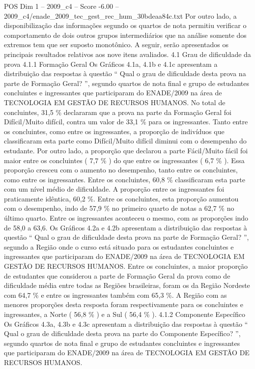 \begin{textsample}{POS Dim 1 – 2009\_c4 – Score -6.00 – 2009\_c4/enade\_2009\_tec\_gest\_rec\_hum\_30bdeaa84c.txt}
Por outro lado, a disponibilização das informações segundo os quartos de nota permitiu verificar o comportamento de dois outros grupos intermediários que na análise somente dos extremos tem que ser suposto monotônico.
A seguir, serão apresentados os principais resultados relativos aos nove itens avaliados. 4.1 Grau de dificuldade da prova 4.1.1 Formação Geral Os Gráficos 4.1a, 4.1b e 4.1c apresentam a distribuição das respostas à questão “ Qual o grau de dificuldade desta prova na parte de Formação Geral? ”, segundo quartos de nota final e grupo de estudantes concluintes e ingressantes que participaram do ENADE/2009 na área de TECNOLOGIA EM GESTÃO DE RECURSOS HUMANOS.
No total de concluintes, 31,5 \% declararam que a prova na parte da Formação Geral foi Difícil/Muito difícil, contra um valor de 33,1 \% para os ingressantes.
Tanto entre os concluintes, como entre os ingressantes, a proporção de indivíduos que classificaram esta parte como Difícil/Muito difícil diminui com o desempenho do estudante.
Por outro lado, a proporção que declarou a parte Fácil/Muito fácil foi maior entre os concluintes ( 7,7 \% ) do que entre os ingressantes ( 6,7 \% ).
Essa proporção cresceu com o aumento no desempenho, tanto entre os concluintes, como entre os ingressantes.
Entre os concluintes, 60,8 \% classificaram esta parte com um nível médio de dificuldade.
A proporção entre os ingressantes foi praticamente idêntica, 60,2 \%.
Entre os concluintes, esta proporção aumentou com o desempenho, indo de 57,9 \% no primeiro quarto de notas a 62,7 \% no último quarto.
Entre os ingressantes aconteceu o mesmo, com as proporções indo de 58,0 a 63,6.
Os Gráficos 4.2a e 4.2b apresentam a distribuição das respostas à questão “ Qual o grau de dificuldade desta prova na parte de Formação Geral? ”, segundo a Região onde o curso está situado para os estudantes concluintes e ingressantes que participaram do ENADE/2009 na área de TECNOLOGIA EM GESTÃO DE RECURSOS HUMANOS.
Entre os concluintes, a maior proporção de estudantes que considerou a parte de Formação Geral da prova como de dificuldade média entre todas as Regiões brasileiras, foram os da Região Nordeste com 64,7 \% e entre os ingressantes também com 65,3 \%.
A Região com as menores proporções desta resposta foram respectivamente para os concluintes e ingressantes, a Norte ( 56,8 \% ) e a Sul ( 56,4 \% ). 4.1.2 Componente Específico Os Gráficos 4.3a, 4.3b e 4.3c apresentam a distribuição das respostas à questão “ Qual o grau de dificuldade desta prova na parte do Componente Específico? ”, segundo quartos de nota final e grupo de estudantes concluintes e ingressantes que participaram do ENADE/2009 na área de TECNOLOGIA EM GESTÃO DE RECURSOS HUMANOS.

\end{textsample}
